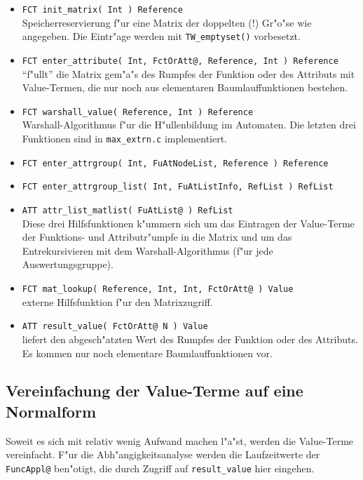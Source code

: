 \begin{itemize}
\item {\tt FCT init\_matrix( Int ) Reference}\\
Speicherreservierung f"ur eine Matrix der doppelten (!) Gr"o"se wie angegeben.
Die Eintr"age werden mit {\tt TW\_emptyset()} vorbesetzt.

\item {\tt FCT enter\_attribute( Int, FctOrAtt@, Reference, Int ) Reference}\\
"`f"ullt"' die Matrix gem"a"s des Rumpfes der Funktion oder des Attributs
mit Value-Termen, die nur noch aus elementaren Baumlauffunktionen bestehen.

\item {\tt FCT warshall\_value( Reference, Int ) Reference}\\
Warshall-Algorithmus f"ur die H"ullenbildung im Automaten. Die letzten
drei Funktionen sind in {\tt max\_extrn.c} implementiert.

\item {\tt FCT enter\_attrgroup( Int, FuAtNodeList, Reference ) Reference}
\item {\tt FCT enter\_attrgroup\_list( Int, FuAtListInfo, RefList ) RefList}
\item {\tt ATT attr\_list\_matlist( FuAtList@ ) RefList}\\

Diese drei Hilfsfunktionen k"ummern sich um das Eintragen der Value-Terme der
Funktions- und Attributr"umpfe in die Matrix und um das Entrekursivieren mit dem
Warshall-Algorithmus (f"ur jede Auswertungsgruppe).

\item {\tt FCT mat\_lookup( Reference, Int, Int, FctOrAtt@ ) Value}\\
externe Hilfsfunktion f"ur den Matrixzugriff.

\item {\tt ATT result\_value( FctOrAtt@ N ) Value}\\
liefert den abgesch"atzten Wert des Rumpfes der Funktion
oder des Attributs. Es kommen nur noch elementare Baumlauffunktionen vor.
\end{itemize}



\subsection{Vereinfachung der Value-Terme auf eine Normalform}

Soweit es sich mit relativ wenig Aufwand machen l"a"st, werden die Value-Terme
vereinfacht. F"ur die Abh"angigkeitsanalyse werden die Laufzeitwerte der
{\tt FuncAppl@} ben"otigt, die durch Zugriff auf {\tt result\_value} hier eingehen.

